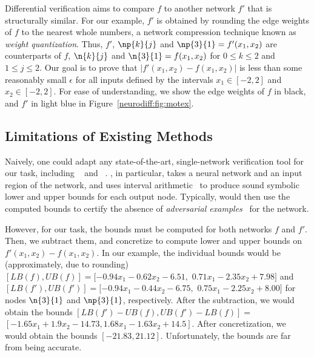 Differential verification aims to compare $ f $ to another network $
f' $ that is structurally similar. For our example, $f'$ is
obtained by rounding the edge weights of $ f $ to the nearest whole
numbers, a network compression technique known as \textit{weight
quantization}.
%
Thus, $ f' $, $ \np{k}{j} $ and $ \np{3}{1} = f'(x_1, x_2) $ are
counterparts of $ f $, $ \n{k}{j} $ and $ \n{3}{1} = f(x_1, x_2) $ for
$0\leq k\leq 2$ and $1\leq j\leq 2$.
%
Our goal is to prove that $ |f'(x_1, x_2) - f(x_1, x_2)| $ is less
than some reasonably small $ \epsilon $ for all inputs defined by the
intervals $ x_1 \in [-2,2]$ and $x_2 \in [-2,2] $.
%
For ease of understanding, we show the edge weights of $ f $ in black, and
$ f' $ in light blue in Figure~\ref{neurodiff:fig:motex}.


\subsection{Limitations of Existing Methods}

Naively, one could adapt any state-of-the-art, single-network
verification tool for our task,
including \DeepPoly{}~\cite{SinghGPV19}
and \Neurify{}~\cite{WangPWYJ18nips}.
%
\Neurify{}, in particular, takes a neural network and
an input region of the network, and uses interval
arithmetic~\cite{moore2009introduction, WangPWYJ18} to produce sound
symbolic lower and upper bounds for each output node.
Typically, \Neurify{} would then use the computed bounds to certify
the absence of \textit{adversarial
examples}~\cite{szegedy2013intriguing} for the network.

However, for our task, the bounds must be computed for both networks $
f $ and $ f' $.  Then, we subtract them, and concretize to compute
lower and upper bounds on $ f'(x_1, x_2) - f(x_1, x_2) $.
%
In our example, the individual bounds would be (approximately, due to
rounding) $[LB(f),UB(f)] = [-0.94x_1 -0.62x_2 -6.51, $ $ 0.71x_1
-2.35x_2 +7.98] $ and $ [LB(f'),UB(f')] = [-0.94x_1 -0.44x_2 -6.75,$ $
0.75x_1 -2.25x_2 +8.00] $ for nodes $ \n{3}{1} $ and $ \np{3}{1} $,
respectively.  After the subtraction, we would obtain the bounds
$[LB(f')-UB(f), UB(f')-LB(f)] = $ $ [-1.65x_1 + 1.9x_2 - 14.73,
1.68x_1 - 1.63x_2 + 14.5] $.  After concretization, we would obtain
the bounds $ [-21.83, 21.12] $.  Unfortunately, the bounds are far
from being accurate.

